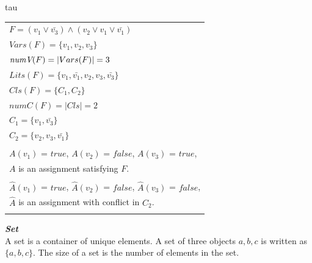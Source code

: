 \documentclass[12pt,a4paper,twoside]{scrartcl}
\numberwithin{equation}{section}
\begin{document}
\begin{center}tau
\begin{table}[H]
\begin{tabular}{l}
$F = (v_1 \lor \bar{v_3}) \land (v_2 \lor v_1 \lor \bar{v_1})$\\	
$Vars(F) = \{v_1, v_2, v_3\}$\\
$\emph{numV}(F) = |Vars(F)| = 3$\\
$Lits(F) = \{v_1, \bar{v_1}, v_2, v_3, \bar{v_3}\}$\\
$Cls(F) = \{C_1, C_2\}$\\
$numC(F) = |Cls| = 2$\\ 
$C_1 = \{v_1, \bar{v_3}\}$\\
$C_2 = \{v_2, v_3, \bar{v_1}\}$\\
\\
$A(v_1)$ = $true$, $A(v_2)$ = $false$, $A(v_3)$ = $true$, \\
$A$  is an assignment satisfying $F$.\\
\\
$\hat{A}(v_1)$ = $true$, $\hat{A}(v_2)$ = $false$, $\hat{A}(v_3)$ = $false$, \\
$\hat{A}$  is an assignment with conflict in $C_2$.\\
\\
\end{tabular}
\label{table:kysymys}
\end{table}
\end{center}




\emph{\textbf{Set}}\\
A set is a container of unique elements. A set of three objects $ a, b, c$ is written as $\{a, b, c\}$. The
size of a set is the number of elements in the set.
\end{document}
